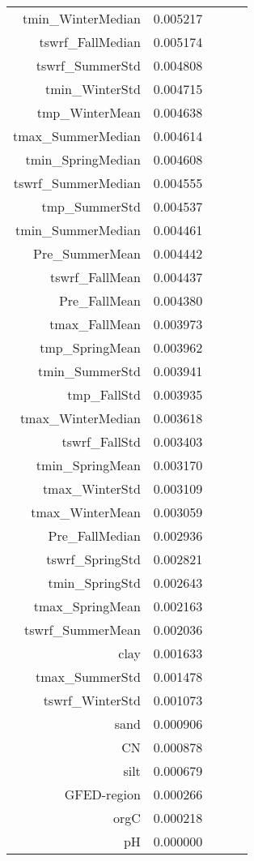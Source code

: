 \begin{tabular}{rrrrr}
tmin_WinterMedian & 0.005217 \\
tswrf_FallMedian & 0.005174 \\
tswrf_SummerStd & 0.004808 \\
tmin_WinterStd & 0.004715 \\
tmp_WinterMean & 0.004638 \\
tmax_SummerMedian & 0.004614 \\
tmin_SpringMedian & 0.004608 \\
tswrf_SummerMedian & 0.004555 \\
tmp_SummerStd & 0.004537 \\
tmin_SummerMedian & 0.004461 \\
Pre_SummerMean & 0.004442 \\
tswrf_FallMean & 0.004437 \\
Pre_FallMean & 0.004380 \\
tmax_FallMean & 0.003973 \\
tmp_SpringMean & 0.003962 \\
tmin_SummerStd & 0.003941 \\
tmp_FallStd & 0.003935 \\
tmax_WinterMedian & 0.003618 \\
tswrf_FallStd & 0.003403 \\
tmin_SpringMean & 0.003170 \\
tmax_WinterStd & 0.003109 \\
tmax_WinterMean & 0.003059 \\
Pre_FallMedian & 0.002936 \\
tswrf_SpringStd & 0.002821 \\
tmin_SpringStd & 0.002643 \\
tmax_SpringMean & 0.002163 \\
tswrf_SummerMean & 0.002036 \\
clay & 0.001633 \\
tmax_SummerStd & 0.001478 \\
tswrf_WinterStd & 0.001073 \\
sand & 0.000906 \\
CN & 0.000878 \\
silt & 0.000679 \\
GFED-region & 0.000266 \\
orgC & 0.000218 \\
pH & 0.000000 \\
\bottomrule
\end{tabular}
